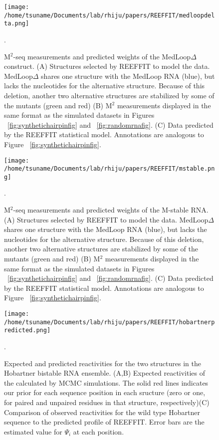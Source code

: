 \documentclass[12pt]{article}
\begin{document}
\begin{figure}[here]
\texttt{[image: /home/tsuname/Documents/lab/rhiju/papers/REEFFIT/medloopdelta.png]}
\caption{M$^2$-seq measurements and predicted weights of the MedLoop$\Delta$ construct. (A) Structures selected by REEFFIT to model the data. MedLoop$\Delta$ shares one structure with the MedLoop RNA (blue), but lacks the nucleotides for the alternative structure. Because of this deletion, another two alternative structures are stabilized by some of the mutants (green and red) (B) M$^2$ measurements displayed in the same format as the simulated datasets in Figures ~\ref{fig:synthetichairpinfig} and ~\ref{fig:randomrnafig}. (C) Data predicted by the REEFFIT statistical model. Annotations are analogous to Figure ~\ref{fig:synthetichairpinfig}.}.
\label{fig:medloopdeltafig}
\end{figure}


\begin{figure}[here]
\texttt{[image: /home/tsuname/Documents/lab/rhiju/papers/REEFFIT/mstable.png]}
\caption{M$^2$-seq measurements and predicted weights of the M-stable RNA. (A) Structures selected by REEFFIT to model the data. MedLoop$\Delta$ shares one structure with the MedLoop RNA (blue), but lacks the nucleotides for the alternative structure. Because of this deletion, another two alternative structures are stabilized by some of the mutants (green and red) (B) M$^2$ measurements displayed in the same format as the simulated datasets in Figures ~\ref{fig:synthetichairpinfig} and ~\ref{fig:randomrnafig}. (C) Data predicted by the REEFFIT statistical model. Annotations are analogous to Figure ~\ref{fig:synthetichairpinfig}.}.
\label{fig:mstablefig}
\end{figure}



\begin{figure}[here]
\texttt{[image: /home/tsuname/Documents/lab/rhiju/papers/REEFFIT/hobartnerpredicted.png]}
\caption{Expected and predicted reactivities for the two structures in the Hobartner bistable RNA ensemble. (A,B) Expected reactivities of the calculated by MCMC simulations. The solid red lines indicates our prior for each sequence position in each sructure (zero or one, for paired and unpaired residues in that structure, respectively)(C)  Comparison of observed reactivities for the wild type Hobartner sequence to the predicted profile of REEFFIT. Error bars are the estimated value for $\Psi_i$ at each position.}.
\label{fig:hobartnerpredictedfig}
\end{figure}
\end{document}
